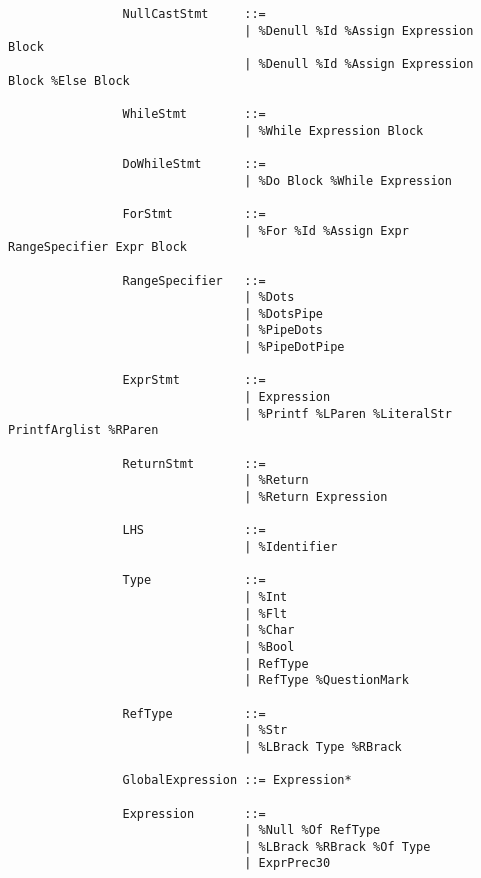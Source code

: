 \documentclass{article}
\begin{document}
\begin{verbatim}
				NullCastStmt     ::=
				                 | %Denull %Id %Assign Expression Block
				                 | %Denull %Id %Assign Expression Block %Else Block
				                 
				WhileStmt        ::=
				                 | %While Expression Block
				
				DoWhileStmt      ::=
				                 | %Do Block %While Expression
				                 
				ForStmt          ::=
				                 | %For %Id %Assign Expr RangeSpecifier Expr Block
				                 
				RangeSpecifier   ::=
				                 | %Dots
				                 | %DotsPipe
				                 | %PipeDots
				                 | %PipeDotPipe
				                 
				ExprStmt         ::=
				                 | Expression
				                 | %Printf %LParen %LiteralStr PrintfArglist %RParen
				                 
				ReturnStmt       ::=
				                 | %Return
				                 | %Return Expression
				                 
				LHS              ::=
				                 | %Identifier
				                 
				Type             ::=
				                 | %Int
				                 | %Flt
				                 | %Char
				                 | %Bool
				                 | RefType
				                 | RefType %QuestionMark
				                 
				RefType          ::=
				                 | %Str
				                 | %LBrack Type %RBrack
				                 
				GlobalExpression ::= Expression*
			
				Expression       ::=
				                 | %Null %Of RefType
				                 | %LBrack %RBrack %Of Type
				                 | ExprPrec30
				

\end{verbatim}
\end{document}
